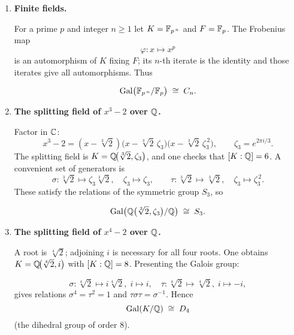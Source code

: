 \documentclass[12pt]{article}
\theoremstyle{definition} %
\theoremstyle{plain} %
\begin{document}
\begin{enumerate}
\item \textbf{Finite fields.}

      For a prime $p$ and integer $n\ge1$ let 
      $K=\Bbb F_{p^{\,n}}$ and $F=\Bbb F_p$.  
      The Frobenius map
      \[
         \varphi : x \longmapsto x^{p}
      \]
      is an automorphism of $K$ fixing $F$; its $n$-th iterate is the
      identity and those iterates give all automorphisms.  Thus

      \[
         \operatorname{Gal}\bigl(\Bbb F_{p^{\,n}}/\Bbb F_p\bigr)
            \;\cong\; C_n.
      \]

\item \textbf{The splitting field of $x^{3}-2$ over $\Bbb Q$.}

      Factor in $\Bbb C$:
      \[
         x^{3}-2 = (x-\sqrt[3]{2})
                    \bigl(x-\sqrt[3]{2}\,\zeta_3\bigr)
                    \bigl(x-\sqrt[3]{2}\,\zeta_3^{\,2}\bigr),
         \qquad \zeta_3 = e^{2\pi i/3}.
      \]
      The splitting field is 
      $K=\Bbb Q\!\bigl(\sqrt[3]{2},\zeta_3\bigr)$,  
      and one checks that $[K:\Bbb Q]=6$.  
      A convenient set of generators is
      \[
         \sigma:\sqrt[3]{2}\mapsto\zeta_3\sqrt[3]{2},
         \quad\zeta_3\mapsto\zeta_3,
         \qquad
         \tau:   \sqrt[3]{2}\mapsto\sqrt[3]{2},
         \quad\zeta_3\mapsto\zeta_3^{\,2}.
      \]
      These satisfy the relations of the symmetric group $S_3$, so

      \[
         \operatorname{Gal}\bigl(\Bbb Q\bigl(\sqrt[3]{2},\zeta_3\bigr)
/\Bbb Q\bigr)\;\cong\;S_3.
      \]

\item \textbf{The splitting field of $x^{4}-2$ over $\Bbb Q$.}

      A root is $\sqrt[4]{2}$; 
      adjoining $i$ is necessary for all four roots.  
      One obtains $K=\Bbb Q\!\bigl(\sqrt[4]{2},i\bigr)$ with $[K:\Bbb Q]=8$.
      Presenting the Galois group:

      \[
          \sigma : \sqrt[4]{2}\mapsto i\sqrt[4]{2},\; i\mapsto i,
          \quad
          \tau   : \sqrt[4]{2}\mapsto \sqrt[4]{2},\; i\mapsto -i,
      \]
      gives relations $\sigma^{4}=\tau^{2}=1$ and
      $\tau\sigma\tau=\sigma^{-1}$.  
      Hence
      \[
         \operatorname{Gal}(K/\Bbb Q)\;\cong\;D_{4}
      \]
      (the dihedral group of order $8$).


\end{enumerate}
\end{document}

